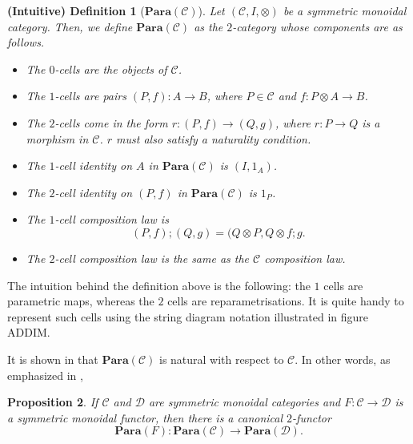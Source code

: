 \documentclass[12pt,a4paper,openright,twoside]{report}
\theoremstyle{plain}
\newtheorem{prop}{Proposition}
\newtheorem{intdef}[prop]{(Intuitive) Definition}
\theoremstyle{definition}
\begin{document}
  \begin{intdef}[$\mathbf{Para}(\mathcal{C})$]
    Let $(\mathcal{C},I,\otimes)$ be a symmetric monoidal category. Then, we define $\mathbf{Para}(\mathcal{C})$ as the $2$-category whose components are as follows.
    \begin{itemize}
      \item The $0$-cells are the objects of $\mathcal{C}$.
      \item The $1$-cells are pairs $(P,f): A \to B$, where $P \in \mathcal{C}$ and $f: P \otimes A \to B$.
      \item The $2$-cells come in the form $r: (P,f) \to (Q,g)$, where $r: P \to Q$ is a morphism in $\mathcal{C}$. $r$ must also satisfy a naturality condition.
      \item The $1$-cell identity on $A$ in $\mathbf{Para}(\mathcal{C})$ is $(I,1_A)$.
      \item The $2$-cell identity on $(P,f)$ in $\mathbf{Para}(\mathcal{C})$ is $1_P$.
      \item The $1$-cell composition law is
        \[(P,f) ; (Q,g) = (Q \otimes P, Q \otimes f ; g.\]
      \item The $2$-cell composition law is the same as the $\mathcal{C}$ composition law.
    \end{itemize}
     
  \end{intdef}

  The intuition behind the definition above is the following: the $1$ cells are parametric maps, whereas the $2$ cells are reparametrisations.
  It is quite handy to represent such cells using the string diagram notation illustrated in figure ADDIM.
  
  
  It is shown in \cite{cruttwellDeepLearningParametric} that $\mathbf{Para}(\mathcal{C})$ is natural with respect to $\mathcal{C}$. In other words, as emphasized in \cite{shieblerCategoryTheoryMachine2021},
  
  \begin{prop}
    If $\mathcal{C}$ and $\mathcal{D}$ are symmetric monoidal categories and $F: \mathcal{C} \to \mathcal{D}$ is a symmetric monoidal functor, then  there is a canonical $2$-functor 
    \[\mathbf{Para}(F): \mathbf{Para}(\mathcal{C}) \to \mathbf{Para}(\mathcal{D}).\]
  \end{prop}






\end{document}
